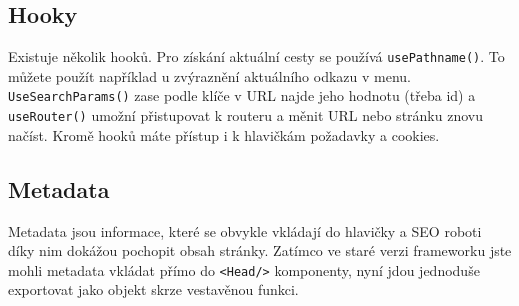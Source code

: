 \subsection*{Hooky}

Existuje několik hooků. Pro získání aktuální cesty se používá \texttt{usePathname()}. To můžete použít například u zvýraznění aktuálního odkazu v menu. \texttt{UseSearchParams()} zase podle klíče v URL najde jeho hodnotu (třeba id) a \texttt{useRouter()} umožní přistupovat k routeru a měnit URL nebo stránku znovu načíst. Kromě hooků máte přístup i k hlavičkám požadavky a cookies.

\subsection*{Metadata}
Metadata jsou informace, které se obvykle vkládají do hlavičky a SEO roboti díky nim dokážou pochopit obsah stránky. Zatímco ve staré verzi frameworku jste mohli metadata vkládat přímo do \texttt{<Head/>} komponenty, nyní jdou jednoduše exportovat jako objekt skrze vestavěnou funkci.



